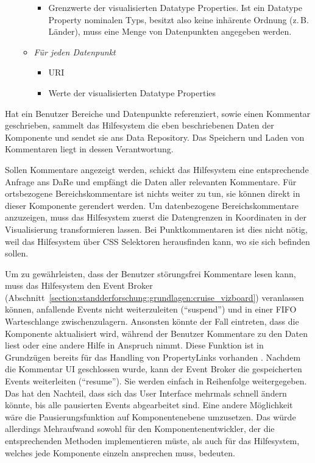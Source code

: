 \documentclass[
	headsepline,
	footsepline,
	fontsize=12pt,
	bibliography=totoc
]{scrbook}
\begin{document}
\begin{itemize}
\begin{itemize}
		\begin{itemize}
			\item Grenzwerte der visualisierten Datatype Properties. Ist ein Datatype Property nominalen Typs, besitzt also keine inhärente Ordnung (z.\,B. Länder), muss eine Menge von Datenpunkten angegeben werden.
		\end{itemize}
	\item \textit{Für jeden Datenpunkt}
		\begin{itemize}
			\item URI
			\item Werte der visualisierten Datatype Properties
		\end{itemize}
	\end{itemize}
\end{itemize}


Hat ein Benutzer Bereiche und Datenpunkte referenziert, sowie einen Kommentar geschrieben, sammelt das Hilfesystem die eben beschriebenen Daten der Komponente und sendet sie ans Data Repository. Das Speichern und Laden von Kommentaren liegt in dessen Verantwortung. 


Sollen Kommentare angezeigt werden, schickt das Hilfesystem eine entsprechende Anfrage ans DaRe und empfängt die Daten aller relevanten Kommentare. Für ortsbezogene Bereichskommentare ist nichts weiter zu tun, sie können direkt in dieser Komponente gerendert werden. Um datenbezogene Bereichskommentare anzuzeigen, muss das Hilfesystem zuerst die Datengrenzen in Koordinaten in der Visualisierung transformieren lassen. Bei Punktkommentaren ist dies nicht nötig, weil das Hilfesystem über CSS Selektoren herausfinden kann, wo sie sich befinden sollen.


Um zu gewährleisten, dass der Benutzer störungsfrei Kommentare lesen kann, muss das Hilfesystem den Event Broker (Abschnitt~\ref{section:standderforschung:grundlagen:cruise_vizboard}) veranlassen können, anfallende Events nicht weiterzuleiten (\enquote{suspend}) und in einer FIFO Warteschlange zwischenzulagern. Ansonsten könnte der Fall eintreten, dass die Komponente aktualisiert wird, während der Benutzer Kommentare zu den Daten liest oder eine andere Hilfe in Anspruch nimmt. Diese Funktion ist in Grundzügen bereits für das Handling von PropertyLinks vorhanden \cite[S. 161]{Pietschmann2012}. Nachdem die Kommentar UI geschlossen wurde, kann der Event Broker die gespeicherten Events weiterleiten (\enquote{resume}). Sie werden einfach in Reihenfolge weitergegeben. Das hat den Nachteil, dass sich das User Interface mehrmals schnell ändern könnte, bis alle pausierten Events abgearbeitet sind. Eine andere Möglichkeit wäre die Pausierungsfunktion auf Komponentenebene umzusetzen. Das würde allerdings Mehraufwand sowohl für den Komponentenentwickler, der die entsprechenden Methoden implementieren müste, als auch für das Hilfesystem, welches jede Komponente einzeln ansprechen muss, bedeuten.
\end{document}
